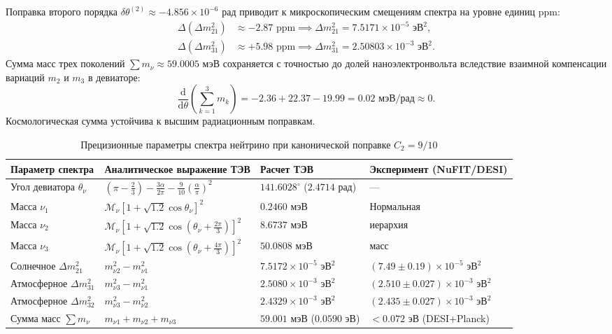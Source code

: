 \documentclass[11pt,a4paper]{article}
\theoremstyle{definition}
\theoremstyle{remark}
\begin{document}
Поправка второго порядка $\delta\theta^{(2)} \approx -4.856 \times 10^{-6}\text{ рад}$ приводит к микроскопическим смещениям спектра на уровне единиц ppm:
\begin{align}
	\Delta(\Delta m_{21}^2) &\approx -2.87\text{ ppm} \implies \Delta m_{21}^2 = 7.5171 \times 10^{-5}\text{ эВ}^2, \\
	\Delta(\Delta m_{31}^2) &\approx +5.98\text{ ppm} \implies \Delta m_{31}^2 = 2.50803 \times 10^{-3}\text{ эВ}^2.
\end{align}
	Сумма масс трех поколений $\sum m_\nu \approx 59.0005\text{ мэВ}$ сохраняется с точностью до долей наноэлектронвольта вследствие взаимной компенсации вариаций $m_2$ и $m_3$ в девиаторе:
\begin{equation}
	\frac{\mathrm{d}}{\mathrm{d}\theta} \left(\sum_{k=1}^3 m_k\right) = -2.36 + 22.37 - 19.99 = 0.02\text{ мэВ/рад} \approx 0.
	\label{eq:bps_cosmo_sum_stability}
\end{equation}
	Космологическая сумма устойчива к высшим радиационным поправкам.
	
\begin{table}[htbp]
\centering
\small
\setlength{\tabcolsep}{3.5pt}
\renewcommand{\arraystretch}{1.25}
\caption{Прецизионные параметры спектра нейтрино при канонической поправке $C_2 = 9/10$}
\label{tab:neutrino_canonical_precision}
\vspace{2mm}
\begin{tabularx}{\textwidth}{
>{\raggedright\arraybackslash}p{2.8cm}
>{\centering\arraybackslash}X
>{\centering\arraybackslash}p{2.6cm}
>{\centering\arraybackslash}p{3.4cm}
}
\toprule
Параметр спектра & Аналитическое выражение ТЭВ & Расчет ТЭВ & Эксперимент (NuFIT/DESI) \\
\midrule
Угол девиатора $\theta_\nu$ & $(\pi - \frac{2}{3}) - \frac{3\alpha}{2\pi} - \frac{9}{10}(\frac{\alpha}{\pi})^2$ & $141.6028^\circ$ ($2.4714\text{ рад}$) & — \\
Масса $\nu_1$ & $\mathcal{M}_\nu [1 + \sqrt{1.2}\cos\theta_\nu]^2$ & $0.2460\text{ мэВ}$ & Нормальная \\
Масса $\nu_2$ & $\mathcal{M}_\nu [1 + \sqrt{1.2}\cos(\theta_\nu + \frac{2\pi}{3})]^2$ & $8.6737\text{ мэВ}$ & иерархия \\
Масса $\nu_3$ & $\mathcal{M}_\nu [1 + \sqrt{1.2}\cos(\theta_\nu + \frac{4\pi}{3})]^2$ & $50.0808\text{ мэВ}$ & масс \\
\midrule
Солнечное $\Delta m_{21}^2$ & $m_{\nu 2}^2 - m_{\nu 1}^2$ & $7.5172 \times 10^{-5}\text{ эВ}^2$ & $(7.49 \pm 0.19) \times 10^{-5}\text{ эВ}^2$ \\
Атмосферное $\Delta m_{31}^2$ & $m_{\nu 3}^2 - m_{\nu 1}^2$ & $2.5080 \times 10^{-3}\text{ эВ}^2$ & $(2.510 \pm 0.027) \times 10^{-3}\text{ эВ}^2$ \\
Атмосферное $\Delta m_{32}^2$ & $m_{\nu 3}^2 - m_{\nu 2}^2$ & $2.4329 \times 10^{-3}\text{ эВ}^2$ & $(2.435 \pm 0.027) \times 10^{-3}\text{ эВ}^2$ \\
\midrule
Сумма масс $\sum m_\nu$ & $m_{\nu 1} + m_{\nu 2} + m_{\nu 3}$ & $59.001\text{ мэВ}$ ($0.0590\text{ эВ}$) & $< 0.072\text{ эВ}$ (DESI+Planck) \\
\bottomrule
\end{tabularx}
\end{table}
\end{document}
